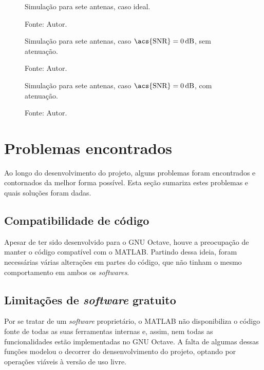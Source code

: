 \begin{figure}[H]
    \centering
    \caption{Simulação para sete antenas, caso ideal.}
    \label{fig:simul_POLY_7_R_50}
    
    \caption*{Fonte: Autor.}
\end{figure}

\begin{figure}[H]
    \centering
    \caption{Simulação para sete antenas, caso $\text{\acs{SNR}} = \SI{0}{\deci\bel}$, sem atenuação.}
    \label{fig:simul_POLY_7_R_50_SNR_1}
    
    \caption*{Fonte: Autor.}
\end{figure}

\begin{figure}[H]
    \centering
    \caption{Simulação para sete antenas, caso $\text{\acs{SNR}} = \SI{0}{\deci\bel}$, com atenuação.}
    \label{fig:simul_POLY_7_R_50_SNR_1_ATT}
    
    \caption*{Fonte: Autor.}
\end{figure}

\section{Problemas encontrados}

Ao longo do desenvolvimento do projeto, alguns problemas foram encontrados e contornados da melhor forma possível.
Esta seção sumariza estes problemas e quais soluções foram dadas.

\subsection{Compatibilidade de código}

Apesar de ter sido desenvolvido para o GNU Octave, houve a preocupação de manter o código compatível com o MATLAB.
Partindo dessa ideia, foram necessárias várias alterações em partes do código, que não tinham o mesmo comportamento em ambos os \textit{softwares}.

\subsection{Limitações de \textit{software} gratuito}

Por se tratar de um \textit{software} proprietário, o MATLAB não disponibiliza o código fonte de todas as suas ferramentas internas e, assim, nem todas as funcionalidades estão implementadas no GNU Octave.
A falta de algumas dessas funções modelou o decorrer do densenvolvimento do projeto, optando por operações viáveis à versão de uso livre.

